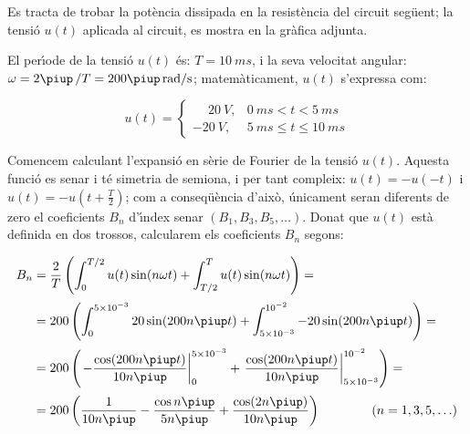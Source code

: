 \begin{exemple}
     Es tracta de trobar la pot\`{e}ncia
     dissipada en la resist\`{e}ncia del circuit seg\"{u}ent; la tensi\'{o} $u(t)$ aplicada al circuit,
     es mostra en la gr\`{a}fica adjunta.

    \begin{center}
        
    \end{center}

     El per\'{\i}ode de la tensi\'{o} $u(t)$ \'{e}s: $T=\SI{10}{ms}$, i la
    seva velocitat angular: $\omega = 2\piup\,/T = 200\piup\unit{rad/s}$;
    matem\`{a}ticament, $u(t)$ s'expressa com:

    \[
    u(t) = \begin{cases} \phantom{-}\SI{20}{V}, & \SI{0}{ms} < t < \SI{5}{ms} \\
           \SI{-20}{V}, & \SI{5}{ms} \leq t \leq \SI{10}{ms} \end{cases}
    \]

    Comencem calculant l'expansi\'{o} en s\`{e}rie de Fourier de la tensi\'{o}
    $u(t)$. Aquesta funci\'{o} es senar i t\'{e} simetria de semiona, i per tant
     compleix: $u(t)=-u(-t)$ i $u(t) = -u(t+\frac{T}{2})$; com a
    conseq\"{u}\`{e}ncia d'aix\`{o}, \'{u}nicament seran diferents de zero el
    coeficients $B_n$ d'\'{\i}ndex senar $(B_1,B_3,B_5,\ldots)$. Donat que
    $u(t)$ est\`{a} definida en dos trossos, calcularem els coeficients
    $B_n$ segons:

    \[
    \begin{split}
        B_n &= \frac{2}{T} \left( \int_0^{T/2} u(t) \sin(n \omega t) +
        \int_{T/2}^{T} u(t) \sin(n \omega t) \right) =\\[0.5ex]
        &= 200 \left( \int_0^{5\times 10^{-3}} 20 \sin(200 n \piup t) +
        \int_{5\times 10^{-3}}^{10^{-2}} -20 \sin(200 n \piup t) \right) =\\[0.5ex]
        &= 200 \left( \left. -\frac{\cos(200 n \piup t)}{10 n \piup}\right|_0^{5\times 10^{-3}}
        +  \left.\frac{\cos(200 n \piup t)}{10 n \piup}\right|_{5\times
        10^{-3}}^{10^{-2}}\right)=\\[0.5ex]
        &= 200\left( \frac{1}{10 n \piup} - \frac{\cos n \piup}{5 n \piup} +
        \frac{\cos (2 n \piup)}{10 n \piup}\right)
        \qquad\qquad(n=1,3,5,\ldots)
    \end{split}
    \]


\end{exemple}
